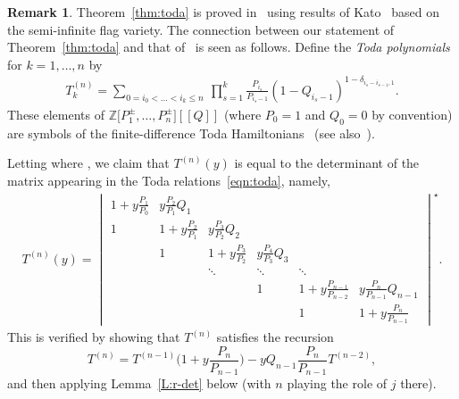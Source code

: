 \documentclass[pdftex]{sigma}
\numberwithin{equation}{section}
\theoremstyle{definition}
\newtheorem{Remark}[Theorem]{Remark}
\newcommand{\Z}{{\mathbb Z}}
\begin{document}
\begin{Remark} \label{rmk:mns}
 Theorem~\ref{thm:toda} is proved in~\cite{maeno.naito.sagaki:QKideal} using results of Kato~\cite{kato:loop} based on the semi-infinite
 flag variety.
 		The connection between our statement of Theorem~\ref{thm:toda} and that of~\cite{maeno.naito.sagaki:QKideal} is seen as follows. Define the \textit{Toda polynomials}  for $k=1,\dots,n$ by
		\begin{align*}
		T^{(n)}_k = \sum_{0= i_0<\dots<i_k\leq n}\ \prod_{s=1}^{k}\frac{P_{i_s}}{P_{i_{s}-1}}\left(1-Q_{i_s-1}\right)^{1-\delta_{i_s-i_{s-1},1}}.
		\end{align*}
		These elements of $\Z\bigl[P_1^{\pm},\dots,P_{n}^{\pm}\bigr][\![Q]\!]$ (where $P_0=1$ and $Q_0=0$ by convention) are symbols of the finite-difference Toda Hamiltonians~\cite{etingof} (see also~\cite{act:2017,gloI,givental_lee,koroteev}).
		
		Letting  where , we claim that $T^{(n)}(y)$ is equal to the determinant of the matrix appearing in the Toda relations~\eqref{eqn:toda}, namely,
		\begin{align*}
 T^{(n)}(y)=\begin{vmatrix}
 1+y\frac{P_1}{P_0} & y\frac{P_2}{P_1}Q_1 & & & & \\[0.9mm]
 1 & 1+y\frac{P_2}{P_1} & y\frac{P_3}{P_2}Q_2 & & & \\[0.9mm]
 & 1 & 1+y\frac{P_3}{P_2} & y\frac{P_{4}}{P_{3}}Q_3 & & \\
 & & \ddots & \ddots & \ddots & \\
& & & 1 & 1+y\frac{P_{n-1}}{P_{n-2}} & y\frac{P_n}{P_{n-1}}Q_{n-1}\\[1mm]
& & & & 1 & 1+y\frac{P_n}{P_{n-1}}
\end{vmatrix}^\star.
		\end{align*}
		This is verified by showing that $T^{(n)}$ satisfies the recursion
		\begin{equation*}%
T^{(n)}= T^{(n-1)} \biggl(1+ y \frac{P_n}{P_{n-1}}\biggr) - y Q_{n-1} \frac{P_n}{P_{n-1}} T^{(n-2)} ,
		\end{equation*}
		and then applying Lemma~\ref{L:r-det} below (with $n$ playing the role of $j$ there).
		\end{Remark}
\end{document}
